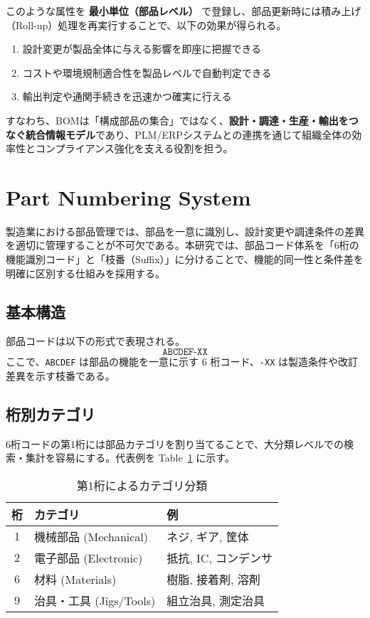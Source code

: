 \documentclass[10pt,conference]{IEEEtran}
\begin{document}
このような属性を \textbf{最小単位（部品レベル）} で登録し、部品更新時には積み上げ（Roll-up）処理を再実行することで、以下の効果が得られる。
\begin{enumerate}
  \item 設計変更が製品全体に与える影響を即座に把握できる  
  \item コストや環境規制適合性を製品レベルで自動判定できる  
  \item 輸出判定や通関手続きを迅速かつ確実に行える  
\end{enumerate}

すなわち、BOMは「構成部品の集合」ではなく、\textbf{設計・調達・生産・輸出をつなぐ統合情報モデル}であり、PLM/ERPシステムとの連携を通じて組織全体の効率性とコンプライアンス強化を支える役割を担う。

\section{Part Numbering System}
製造業における部品管理では、部品を一意に識別し、設計変更や調達条件の差異を適切に管理することが不可欠である。本研究では、部品コード体系を「6桁の機能識別コード」と「枝番（Suffix）」に分けることで、機能的同一性と条件差を明確に区別する仕組みを採用する。

\subsection{基本構造}
部品コードは以下の形式で表現される。
\[
\texttt{ABCDEF-XX}
\]
ここで、\texttt{ABCDEF} は部品の機能を一意に示す 6 桁コード、\texttt{-XX} は製造条件や改訂差異を示す枝番である。

\subsection{桁別カテゴリ}
6桁コードの第1桁には部品カテゴリを割り当てることで、大分類レベルでの検索・集計を容易にする。代表例を Table~\ref{tab:categories} に示す。

\begin{table}[h]
  \centering
  \caption{第1桁によるカテゴリ分類}
  \label{tab:categories}
  \begin{tabular}{cll}
    \hline
    桁 & カテゴリ & 例 \\
    \hline
    1 & 機械部品 (Mechanical) & ネジ, ギア, 筐体 \\
    2 & 電子部品 (Electronic) & 抵抗, IC, コンデンサ \\
    6 & 材料 (Materials) & 樹脂, 接着剤, 溶剤 \\
    9 & 治具・工具 (Jigs/Tools) & 組立治具, 測定治具 \\
    \hline
  \end{tabular}
\end{table}
\end{document}
